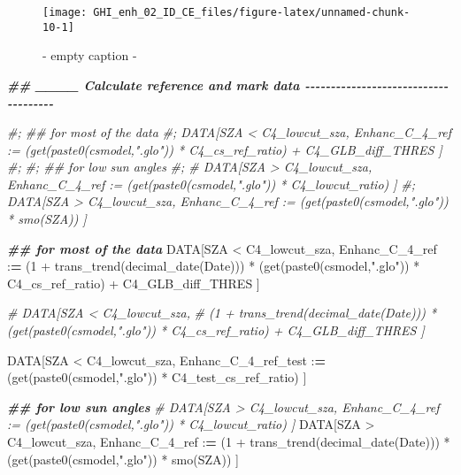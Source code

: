 \documentclass[
  10pt,
  a4paper,oneside]{article}
\newenvironment{Shaded}{\begin{snugshade}}{\end{snugshade}}
\newcommand{\CommentTok}[1]{\textcolor[rgb]{0.56,0.35,0.01}{\textit{#1}}}
\newcommand{\DecValTok}[1]{\textcolor[rgb]{0.00,0.00,0.81}{#1}}
\newcommand{\DocumentationTok}[1]{\textcolor[rgb]{0.56,0.35,0.01}{\textbf{\textit{#1}}}}
\newcommand{\ErrorTok}[1]{\textcolor[rgb]{0.64,0.00,0.00}{\textbf{#1}}}
\newcommand{\FunctionTok}[1]{\textcolor[rgb]{0.00,0.00,0.00}{#1}}
\newcommand{\NormalTok}[1]{#1}
\newcommand{\SpecialCharTok}[1]{\textcolor[rgb]{0.00,0.00,0.00}{#1}}
\newcommand{\StringTok}[1]{\textcolor[rgb]{0.31,0.60,0.02}{#1}}
\begin{document}
\begin{figure}[H]

{\centering \texttt{[image: GHI\_enh\_02\_ID\_CE\_files/figure-latex/unnamed-chunk-10-1]} 

}

\caption{ - empty caption - }\label{fig:unnamed-chunk-10}
\end{figure}

\begin{Shaded}
\begin{Highlighting}[]
\DocumentationTok{\#\# \_\_\_\_ Calculate reference and mark data  {-}{-}{-}{-}{-}{-}{-}{-}{-}{-}{-}{-}{-}{-}{-}{-}{-}{-}{-}{-}{-}{-}{-}{-}{-}{-}{-}{-}{-}{-}{-}{-}{-}{-}{-}{-}{-}}

\CommentTok{\#; \#\# for most of the data}
\CommentTok{\#; DATA[SZA \textless{} C4\_lowcut\_sza, Enhanc\_C\_4\_ref := (get(paste0(csmodel,".glo")) * C4\_cs\_ref\_ratio) + C4\_GLB\_diff\_THRES ]}
\CommentTok{\#;}
\CommentTok{\#; \#\# for low sun angles}
\CommentTok{\#; \# DATA[SZA \textgreater{} C4\_lowcut\_sza, Enhanc\_C\_4\_ref := (get(paste0(csmodel,".glo")) * C4\_lowcut\_ratio) ]}
\CommentTok{\#; DATA[SZA \textgreater{} C4\_lowcut\_sza, Enhanc\_C\_4\_ref := (get(paste0(csmodel,".glo")) * smo(SZA)) ]}


\DocumentationTok{\#\# for most of the data}
\NormalTok{DATA[SZA }\SpecialCharTok{\textless{}}\NormalTok{ C4\_lowcut\_sza,}
\NormalTok{     Enhanc\_C\_4\_ref }\SpecialCharTok{:}\ErrorTok{=}
\NormalTok{       (}\DecValTok{1} \SpecialCharTok{+} \FunctionTok{trans\_trend}\NormalTok{(}\FunctionTok{decimal\_date}\NormalTok{(Date))) }\SpecialCharTok{*}\NormalTok{ (}\FunctionTok{get}\NormalTok{(}\FunctionTok{paste0}\NormalTok{(csmodel,}\StringTok{".glo"}\NormalTok{)) }\SpecialCharTok{*}\NormalTok{ C4\_cs\_ref\_ratio) }\SpecialCharTok{+}\NormalTok{ C4\_GLB\_diff\_THRES ]}

\CommentTok{\# DATA[SZA \textless{} C4\_lowcut\_sza,}
\CommentTok{\#       (1 + trans\_trend(decimal\_date(Date))) * (get(paste0(csmodel,".glo")) * C4\_cs\_ref\_ratio) + C4\_GLB\_diff\_THRES ]}

\NormalTok{DATA[SZA }\SpecialCharTok{\textless{}}\NormalTok{ C4\_lowcut\_sza,}
\NormalTok{     Enhanc\_C\_4\_ref\_test }\SpecialCharTok{:}\ErrorTok{=}\NormalTok{                                    (}\FunctionTok{get}\NormalTok{(}\FunctionTok{paste0}\NormalTok{(csmodel,}\StringTok{".glo"}\NormalTok{)) }\SpecialCharTok{*}\NormalTok{ C4\_test\_cs\_ref\_ratio) ]}

\DocumentationTok{\#\# for low sun angles}
\CommentTok{\# DATA[SZA \textgreater{} C4\_lowcut\_sza, Enhanc\_C\_4\_ref := (get(paste0(csmodel,".glo")) * C4\_lowcut\_ratio) ]}
\NormalTok{DATA[SZA }\SpecialCharTok{\textgreater{}}\NormalTok{ C4\_lowcut\_sza,}
\NormalTok{     Enhanc\_C\_4\_ref }\SpecialCharTok{:}\ErrorTok{=}\NormalTok{ (}\DecValTok{1} \SpecialCharTok{+} \FunctionTok{trans\_trend}\NormalTok{(}\FunctionTok{decimal\_date}\NormalTok{(Date))) }\SpecialCharTok{*}\NormalTok{ (}\FunctionTok{get}\NormalTok{(}\FunctionTok{paste0}\NormalTok{(csmodel,}\StringTok{".glo"}\NormalTok{)) }\SpecialCharTok{*} \FunctionTok{smo}\NormalTok{(SZA)) ]}


\end{Highlighting}
\end{Shaded}
\end{document}
